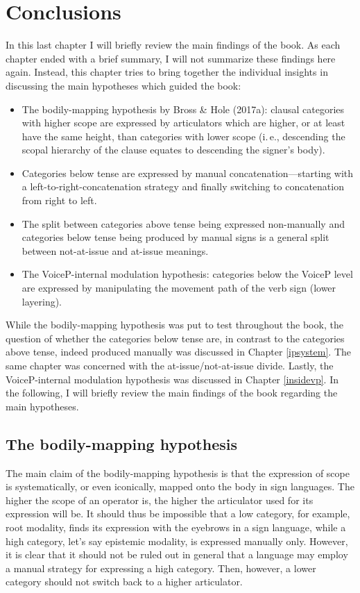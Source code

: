 \chapter{Conclusions}\label{chapterconclusions}
In this last chapter I will briefly review the main findings of the book. As each chapter ended with a brief summary, I will not summarize these findings here again. Instead, this chapter tries to bring together the individual insights in discussing the main hypotheses which guided the book:


\begin{itemize}[itemsep=0pt]
	\item The bodily-mapping hypothesis by Bross \& Hole (2017a): clausal categories with higher scope are expressed by articulators which are higher, or at least have the same height, than categories with lower scope (i.\,e., descending the scopal hierarchy of the clause equates to descending the signer's body).
	\item Categories below tense are expressed by manual concatenation---starting with a left-to-right-concatenation strategy and finally switching to concatenation from right to left.
	\item The split between categories above tense being expressed non-manually and categories below tense being produced by manual signs is a general split between not-at-issue and at-issue meanings.
	\item The VoiceP-internal modulation hypothesis: categories below the VoiceP level are expressed by manipulating the movement path of the verb sign (lower layering).
\end{itemize}

\noindent While the bodily-mapping hypothesis was put to test throughout the book, the question of whether the categories below tense are, in contrast to the categories above tense, indeed produced manually was discussed in Chapter \ref{ipsystem}. The same chapter was concerned with the at-issue/not-at-issue divide. Lastly, the VoiceP-internal modulation hypothesis was discussed in Chapter \ref{insidevp}. In the following, I will briefly review the main findings of the book regarding the main hypotheses.

\section{The bodily-mapping hypothesis}
The main claim of the bodily-mapping hypothesis is that the expression of scope is systematically, or even iconically, mapped onto the body in sign languages. The higher the scope of an operator is, the higher the articulator used for its expression will be. It should thus be impossible that a low category, for example, root modality, finds its expression with the eyebrows in a sign language, while a high category, let's say epistemic modality, is expressed manually only. However, it is clear that it should not be ruled out in general that a language may employ a manual strategy for expressing a high category. Then, however, a lower category should not switch back to a higher articulator. 

